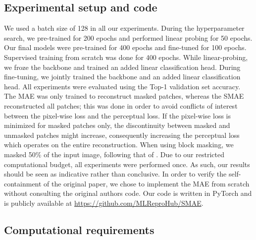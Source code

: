 \subsection{Experimental setup and code}
We used a batch size of 128 in all our experiments. During the hyperparameter search, we pre-trained for 200 epochs and performed linear probing for 50 epochs. Our final models were pre-trained for 400 epochs and fine-tuned for 100 epochs. Supervised training from scratch was done for 400 epochs. While linear-probing, we froze the backbone and trained an added linear classification head. During fine-tuning, we jointly trained the backbone and an added linear classification head. All experiments were evaluated using the Top-1 validation set accuracy. The MAE was only trained to reconstruct masked patches, whereas the SMAE reconstructed all patches; this was done in order to avoid conflicts of interest between the pixel-wise loss and the perceptual loss. If the pixel-wise loss is minimized for masked patches only, the discontinuity between masked and unmasked patches might increase, consequently increasing the perceptual loss which operates on the entire reconstruction. When using block masking, we masked 50\% of the input image, following that of \cite{mae}. Due to our restricted computational budget, all experiments were performed once. As such, our results should be seen as indicative rather than conclusive. In order to verify the self-containment of the original paper, we chose to implement the MAE from scratch without consulting the original authors code. Our code is written in PyTorch and is publicly available at \href{https://github.com/MLReproHub/SMAE}{https://github.com/MLReproHub/SMAE}.

\subsection{Computational requirements}

